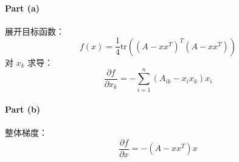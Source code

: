 \paragraph{Part (a)}  
展开目标函数：
\[
f(x) = \frac{1}{4} \text{tr}((A - xx^T)^T(A - xx^T))
\]
对 \(x_k\) 求导：
\[
\frac{\partial f}{\partial x_k} = -\sum_{i=1}^n (A_{ik} - x_i x_k)x_i
\]

\paragraph{Part (b)}  
整体梯度：
\[
\frac{\partial f}{\partial x} = -(A - xx^T)x
\]